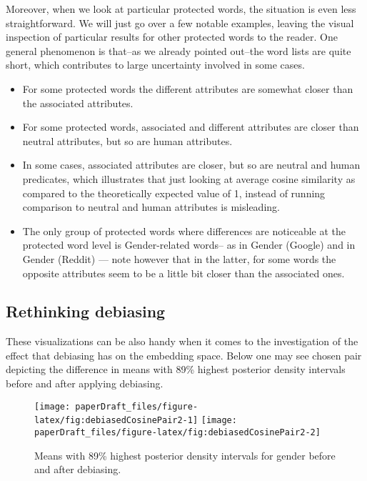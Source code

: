 \documentclass[
  10pt,
  dvipsnames,enabledeprecatedfontcommands]{scrartcl}
\begin{document}
Moreover, when we look at particular protected words, the situation is
even less straightforward. We will just go over a few notable examples,
leaving the visual inspection of particular results for other protected
words to the reader. One general phenomenon is that--as we already
pointed out--the word lists are quite short, which contributes to large
uncertainty involved in some cases.

\begin{itemize}
\item
  For some protected words the different attributes are somewhat closer
  than the associated attributes.
\item
  For some protected words, associated and different attributes are
  closer than neutral attributes, but so are human attributes.
\item
  In some cases, associated attributes are closer, but so are neutral
  and human predicates, which illustrates that just looking at average
  cosine similarity as compared to the theoretically expected value of
  1, instead of running comparison to neutral and human attributes is
  misleading.
\item
  The only group of protected words where differences are noticeable at
  the protected word level is Gender-related words-- as in Gender
  (Google) and in Gender (Reddit) --- note however that in the latter,
  for some words the opposite attributes seem to be a little bit closer
  than the associated ones.
\end{itemize}

\hypertarget{rethinking-debiasing}{%
\subsection{Rethinking debiasing}\label{rethinking-debiasing}}

These visualizations can be also handy when it comes to the
investigation of the effect that debiasing has on the embedding space.
Below one may see chosen pair depicting the difference in means with
89\% highest posterior density intervals before and after applying
debiasing.

\begin{figure}[H]

\begin{center}\texttt{[image: paperDraft\_files/figure-latex/fig:debiasedCosinePair2-1]} \texttt{[image: paperDraft\_files/figure-latex/fig:debiasedCosinePair2-2]} \end{center}
\caption{Means with 89\% highest posterior density intervals for gender before and after debiasing.}
\label{fig:empiricalDebiasedPair}
\end{figure}
\end{document}
